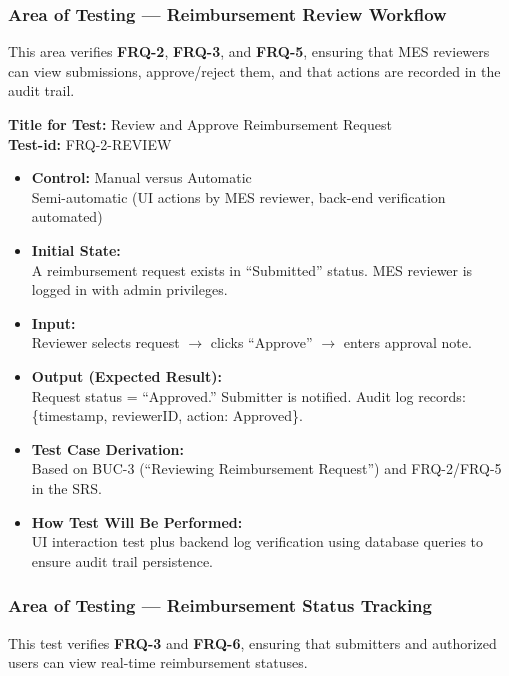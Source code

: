 \documentclass[12pt, titlepage]{article}
\begin{document}
\subsubsection{Area of Testing — Reimbursement Review Workflow}

This area verifies \textbf{FRQ-2}, \textbf{FRQ-3}, and \textbf{FRQ-5}, ensuring that MES reviewers can view submissions, approve/reject them, and that actions are recorded in the audit trail.

\textbf{Title for Test:} Review and Approve Reimbursement Request \\
\textbf{Test-id:} FRQ-2-REVIEW

\begin{itemize}
    \item \textbf{Control:} Manual versus Automatic \\
    Semi-automatic (UI actions by MES reviewer, back-end verification automated)
    \item \textbf{Initial State:} \\
    A reimbursement request exists in ``Submitted'' status. MES reviewer is logged in with admin privileges.
    \item \textbf{Input:} \\
    Reviewer selects request $\rightarrow$ clicks ``Approve'' $\rightarrow$ enters approval note.
    \item \textbf{Output (Expected Result):} \\
    Request status = ``Approved.'' Submitter is notified. Audit log records: \{timestamp, reviewerID, action: Approved\}.
    \item \textbf{Test Case Derivation:} \\
    Based on BUC-3 (``Reviewing Reimbursement Request'') and FRQ-2/FRQ-5 in the SRS.
    \item \textbf{How Test Will Be Performed:} \\
    UI interaction test plus backend log verification using database queries to ensure audit trail persistence.
\end{itemize}

\subsubsection{Area of Testing — Reimbursement Status Tracking}

This test verifies \textbf{FRQ-3} and \textbf{FRQ-6}, ensuring that submitters and authorized users can view real-time reimbursement statuses.
\end{document}

